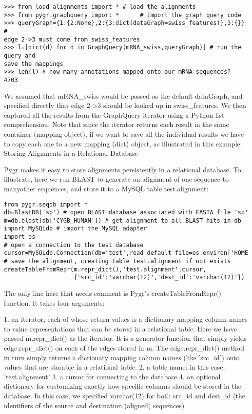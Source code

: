 \documentclass{howto}
\begin{document}
\begin{verbatim}
>>> from load_alignments import * # load the alignments
>>> from pygr.graphquery import *      # import the graph query code
>>> queryGraph={1:{2:None},2:{3:dict(dataGraph=swiss_features)},3:{}} # 
edge 2->3 must come from swiss_features
>>> l=[dict(d) for d in GraphQuery(mRNA_swiss,queryGraph)] # run the query and 
save the mappings
>>> len(l) # how many annotations mapped onto our mRNA sequences?
4703
\end{verbatim}

We assumed that mRNA_swiss would be passed as the default dataGraph, and specified directly that edge 2->3 should be looked up in swiss_features.  We then captured all the results from the GraphQuery iterator using a Python list comprehension.  Note that since the iterator returns each result in the same container (mapping object), if we want to save all the individual results we have to copy each one to a new mapping (dict) object, as illustrated in this example.
Storing Alignments in a Relational Database

Pygr makes it easy to store alignments persistently in a relational database.  To illustrate, here we run BLAST to generate an alignment of one sequence to manyother sequences, and store it to a MySQL table test.alignment:

\begin{verbatim}
from pygr.seqdb import *
db=BlastDB('sp') # open BLAST database associated with FASTA file 'sp'
m=db.blast(db['CYGB_HUMAN']) # get alignment to all BLAST hits in db
import MySQLdb # import the MySQL adapter
import os
# open a connection to the test database
cursor=MySQLdb.Connection(db='test',read_default_file=os.environ['HOME']+'/.my.cnf').cursor()
# save the alignment, creating table test.alignment if not exists
createTableFromRepr(m.repr_dict(),'test.alignment',cursor,
                    {'src_id':'varchar(12)','dest_id':'varchar(12)'})
\end{verbatim}

The only line here that needs comment is Pygr's createTableFromRepr() function.  It takes four arguments:

   1. an iterator, each of whose return values is a dictionary mapping column names to value representations that can be stored in a relational table.  Here we have passed m.repr_dict() as the iterator.  It is a generator function that simply yields edge.repr_dict() on each of the edges stored in m.  The edge.repr_dict() method in turn simply returns a dictionary mapping column names (like 'src_id') onto values that are storable in a relational table.
   2. a table name: in this case, 'test.alignment'
   3. a cursor for connecting to the database
   4. an optional dictionary for customizing exactly how specific columns should be stored in the database.  In this case, we specified varchar(12) for both src_id and dest_id (the identifiers of the source and destination (aligned) sequences)
\end{document}
